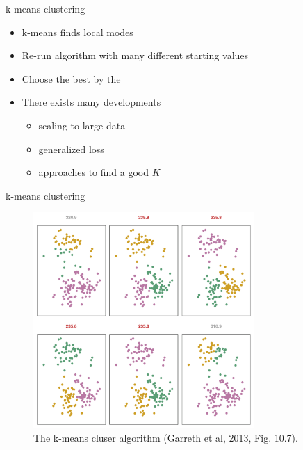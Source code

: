\documentclass[10pt]{beamer}
\begin{document}
\begin{frame}{k-means clustering}

\begin{itemize}
\item k-means finds {\color{uured} local modes}
\item Re-run algorithm with many {\color{uured} different starting values}
\item Choose the best by the 
\pause
\item There exists many developments
\begin{itemize}
\item scaling to large data
\pause
\item generalized loss
\pause
\item approaches to find a good $K$
\end{itemize}
\end{itemize}
\end{frame}


\begin{frame}{k-means clustering}

\begin{figure}[h]
\centering
\includegraphics[width=0.75\textwidth]{fig/fig_10_7_kmeans_local_modes.png}
\caption{The k-means cluser algorithm (Garreth et al, 2013, Fig. 10.7).}
\end{figure}

\end{frame}
\end{document}
